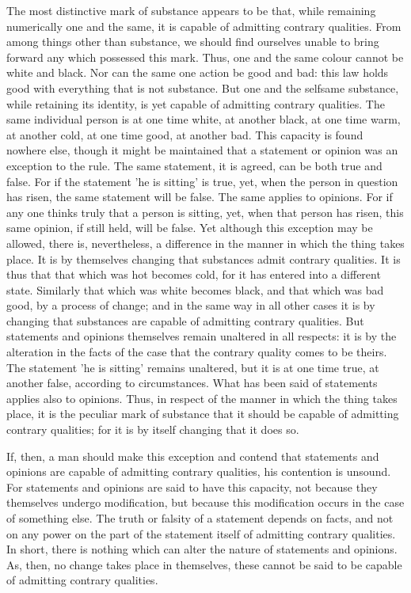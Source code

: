The most distinctive mark of substance appears to be that, while
remaining numerically one and the same, it is capable of admitting
contrary qualities. From among things other than substance, we should
find ourselves unable to bring forward any which possessed this mark.
Thus, one and the same colour cannot be white and black. Nor can the
same one action be good and bad: this law holds good with everything
that is not substance. But one and the selfsame substance, while
retaining its identity, is yet capable of admitting contrary qualities.
The same individual person is at one time white, at another black, at
one time warm, at another cold, at one time good, at another bad. This
capacity is found nowhere else, though it might be maintained that a
statement or opinion was an exception to the rule. The same statement,
it is agreed, can be both true and false. For if the statement 'he is
sitting' is true, yet, when the person in question has risen, the same
statement will be false. The same applies to opinions. For if any one
thinks truly that a person is sitting, yet, when that person has risen,
this same opinion, if still held, will be false. Yet although this
exception may be allowed, there is, nevertheless, a difference in the
manner in which the thing takes place. It is by themselves changing
that substances admit contrary qualities. It is thus that that which
was hot becomes cold, for it has entered into a different state.
Similarly that which was white becomes black, and that which was bad
good, by a process of change; and in the same way in all other cases it
is by changing that substances are capable of admitting contrary
qualities. But statements and opinions themselves remain unaltered in
all respects: it is by the alteration in the facts of the case that the
contrary quality comes to be theirs. The statement 'he is sitting'
remains unaltered, but it is at one time true, at another false,
according to circumstances. What has been said of statements applies
also to opinions. Thus, in respect of the manner in which the thing
takes place, it is the peculiar mark of substance that it should be
capable of admitting contrary qualities; for it is by itself changing
that it does so.

If, then, a man should make this exception and contend that statements
and opinions are capable of admitting contrary qualities, his
contention is unsound. For statements and opinions are said to have
this capacity, not because they themselves undergo modification, but
because this modification occurs in the case of something else. The
truth or falsity of a statement depends on facts, and not on any power
on the part of the statement itself of admitting contrary qualities. In
short, there is nothing which can alter the nature of statements and
opinions. As, then, no change takes place in themselves, these cannot
be said to be capable of admitting contrary qualities.

